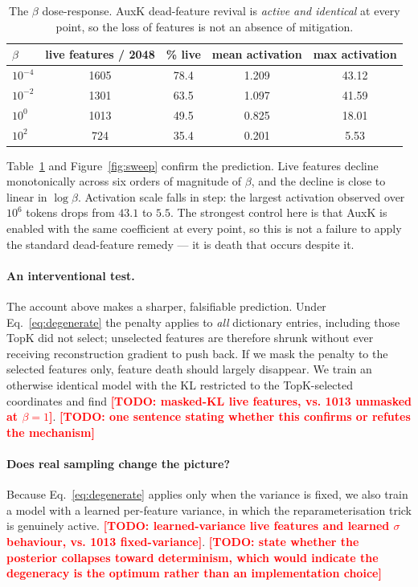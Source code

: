 \documentclass{article}
\newcommand{\TODO}[1]{\textcolor{red}{\textbf{[TODO: #1]}}}
\begin{document}
\begin{table}[t]
\centering
\caption{The $\beta$ dose-response. AuxK dead-feature revival is \emph{active and
identical} at every point, so the loss of features is not an absence of
mitigation.}
\label{tab:sweep}
\begin{tabular}{lcccc}
\toprule
$\beta$ & live features / 2048 & \% live & mean activation & max activation \\
\midrule
$10^{-4}$ & 1605 & 78.4 & 1.209 & 43.12 \\
$10^{-2}$ & 1301 & 63.5 & 1.097 & 41.59 \\
$10^{0}$  & 1013 & 49.5 & 0.825 & 18.01 \\
$10^{2}$  &  724 & 35.4 & 0.201 & \phantom{0}5.53 \\
\bottomrule
\end{tabular}
\end{table}

Table~\ref{tab:sweep} and Figure~\ref{fig:sweep} confirm the prediction. Live
features decline monotonically across six orders of magnitude of $\beta$, and the
decline is close to linear in $\log\beta$. Activation scale falls in step: the
largest activation observed over $10^6$ tokens drops from $43.1$ to $5.5$. The
strongest control here is that AuxK is enabled with the same coefficient at every
point, so this is not a failure to apply the standard dead-feature remedy --- it is
death that occurs despite it.

\paragraph{An interventional test.} The account above makes a sharper, falsifiable
prediction. Under Eq.~\ref{eq:degenerate} the penalty applies to \emph{all}
dictionary entries, including those TopK did not select; unselected features are
therefore shrunk without ever receiving reconstruction gradient to push back. If
we mask the penalty to the selected features only, feature death should largely
disappear. We train an otherwise identical model with the KL restricted to the
TopK-selected coordinates and find \TODO{masked-KL live features, vs. 1013
unmasked at $\beta{=}1$}. \TODO{one sentence stating whether this confirms or
refutes the mechanism}

\paragraph{Does real sampling change the picture?} Because
Eq.~\ref{eq:degenerate} applies only when the variance is fixed, we also train a
model with a learned per-feature variance, in which the reparameterisation trick
is genuinely active. \TODO{learned-variance live features and learned $\sigma$
behaviour, vs. 1013 fixed-variance}. \TODO{state whether the posterior collapses
toward determinism, which would indicate the degeneracy is the optimum rather
than an implementation choice}
\end{document}
